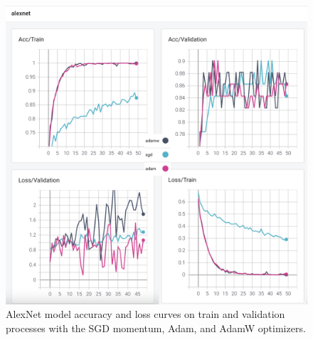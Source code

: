 
\begin{figure}[!h]
    \centering
    \includegraphics[width=\linewidth]{fig/alexnet.png}
    \vspace{2mm}
    \caption{AlexNet model accuracy and loss curves on train and validation processes with the SGD momentum, Adam, and AdamW optimizers.}
    \label{fig:alexnet_plots}
\end{figure}

